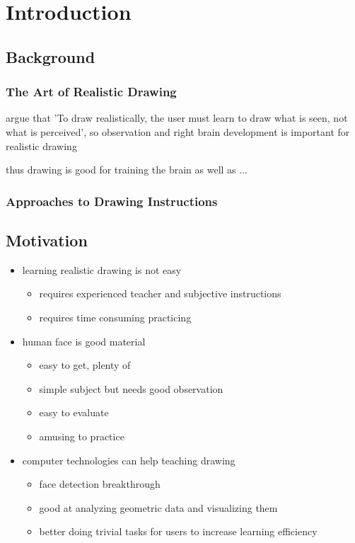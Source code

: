 \chapter{Introduction}\label{sec-introduction}

\section{Background}

		\subsection{The Art of Realistic Drawing}
				
				argue that 'To draw realistically, the user must learn to draw what is seen, not what is perceived', so observation and right brain development is important for realistic drawing
				
				thus drawing is good for training the brain as well as ...
					
		\subsection{Approaches to Drawing Instructions}
		
\section{Motivation}

		\begin{itemize}
			\item learning realistic drawing is not easy
				\begin{itemize}
					\item requires experienced teacher and subjective instructions
					\item requires time consuming practicing
				\end{itemize}
				
			\item human face is good material
				\begin{itemize}
					\item easy to get, plenty of
					\item simple subject but needs good observation 
					\item easy to evaluate
					\item amusing to practice
				\end{itemize}
				
			\item computer technologies can help teaching drawing
				\begin{itemize}
					\item face detection breakthrough
					\item good at analyzing geometric data and visualizing them
					\item better doing trivial tasks for users to increase learning efficiency
				\end{itemize}
		\end{itemize}
		
